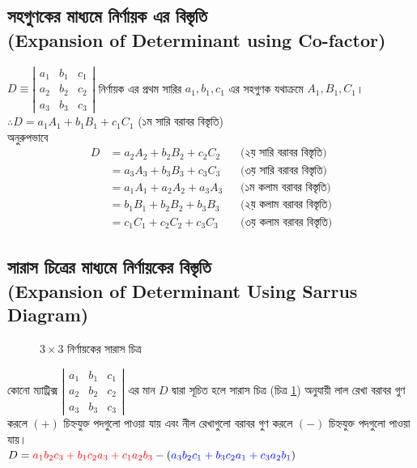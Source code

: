 \subsection{সহগুণকের মাধ্যমে নির্ণায়ক এর বিস্তৃতি \\(Expansion of Determinant using Co-factor)}\label{exp-co-fact}
$D\equiv\left|\begin{array}{ccc}
a_1 & b_1 & c_1 \\
a_2 & b_2 & c_2 \\
a_3 & b_3 & c_3
\end{array}\right|$ নির্ণায়ক এর প্রথম সারির $a_1, b_1, c_1$ এর সহগুণক যথাক্রমে $A_1, B_1, C_1$। $\therefore D=a_1A_1+b_1B_1+c_1C_1$ (১ম সারি বরাবর বিস্তৃতি)\\
অনুরুপভাবে 
\begin{align*}
D &=a_2A_2+b_2B_2+c_2C_2 \hspace{5pt} & \text{ (২য় সারি বরাবর বিস্তৃতি)}\\
&=a_3A_3+b_3B_3+c_3C_3 \hspace{5pt} & \text{ (৩য় সারি বরাবর বিস্তৃতি)}\\
&=a_1A_1+a_2A_2+a_3A_3 \hspace{5pt} & \text{ (১ম কলাম বরাবর বিস্তৃতি)}\\
&=b_1B_1+b_2B_2+b_3B_3 \hspace{5pt} & \text{ (২য় কলাম বরাবর বিস্তৃতি)}\\
&=c_1C_1+c_2C_2+c_3C_3 \hspace{5pt} & \text{ (৩য় কলাম বরাবর বিস্তৃতি)}
\end{align*}
\subsection{সারাস চিত্রের মাধ্যমে নির্ণায়কের বিস্তৃতি \\(Expansion of Determinant Using Sarrus Diagram)}\label{sec-sarrus}
\begin{figure}[h]
	\centering
	
	\caption{$3\times 3$ নির্ণায়কের সারাস চিত্র}
	\label{fig:sarrus}
\end{figure}
কোনো ম্যাট্রিক্স 
$\left|\begin{array}{ccc}
a_1 & b_1 & c_1 \\
a_2 & b_2 & c_2 \\
a_3 & b_3 & c_3
\end{array}\right|$ এর মান $D$ দ্বারা সূচিত হলে সারাস চিত্র (চিত্র \ref{fig:sarrus}) অনুযায়ী লাল রেখা বরাবর গুণ করলে $(+)$ চিহ্নযুক্ত পদগুলো পাওয়া যায় এবং নীল রেখাগুলো বরাবর গুণ করলে $(-)$ চিহ্নযুক্ত পদগুলো পাওয়া যায়।\\
$D=\textcolor{red}{a_1b_2c_3+b_1c_2a_3+c_1a_2b_3}-(\textcolor{blue}{a_3b_2c_1+b_3c_2a_1+c_3a_2b_1})$

